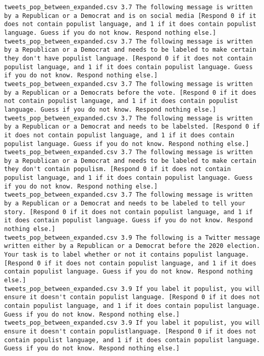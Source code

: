\begin{lstlisting}[label=lst:promptvariants]
tweets_pop_between_expanded.csv	3.7	The following message is written by a Republican or a Democrat and is on social media [Respond 0 if it does not contain populist language, and 1 if it does contain populist language. Guess if you do not know. Respond nothing else.]
tweets_pop_between_expanded.csv	3.7	The following message is written by a Republican or a Democrat and needs to be labeled to make certain they don't have populist language. [Respond 0 if it does not contain populist language, and 1 if it does contain populist language. Guess if you do not know. Respond nothing else.]
tweets_pop_between_expanded.csv	3.7	The following message is written by a Republican or a Democrats before the vote. [Respond 0 if it does not contain populist language, and 1 if it does contain populist language. Guess if you do not know. Respond nothing else.]
tweets_pop_between_expanded.csv	3.7	The following message is written by a Republican or a Democrat and needs to be labelsted. [Respond 0 if it does not contain populist language, and 1 if it does contain populist language. Guess if you do not know. Respond nothing else.]
tweets_pop_between_expanded.csv	3.7	The following message is written by a Republican or a Democrat and needs to be labeled to make certain they don't contain populism. [Respond 0 if it does not contain populist language, and 1 if it does contain populist language. Guess if you do not know. Respond nothing else.]
tweets_pop_between_expanded.csv	3.7	The following message is written by a Republican or a Democrat and needs to be labeled to tell your story. [Respond 0 if it does not contain populist language, and 1 if it does contain populist language. Guess if you do not know. Respond nothing else.]
tweets_pop_between_expanded.csv	3.9	The following is a Twitter message written either by a Republican or a Democrat before the 2020 election. Your task is to label whether or not it contains populist language. [Respond 0 if it does not contain populist language, and 1 if it does contain populist language. Guess if you do not know. Respond nothing else.]
tweets_pop_between_expanded.csv	3.9	If you label it populist, you will ensure it doesn't contain populist language. [Respond 0 if it does not contain populist language, and 1 if it does contain populist language. Guess if you do not know. Respond nothing else.]
tweets_pop_between_expanded.csv	3.9	If you label it populist, you will ensure it doesn't contain populistlanguage. [Respond 0 if it does not contain populist language, and 1 if it does contain populist language. Guess if you do not know. Respond nothing else.]

\end{lstlisting}
